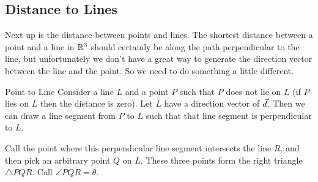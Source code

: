 \subsection{Distance to Lines}

Next up is the distance between points and lines. The shortest distance between a point and a line in $\mathbb{R}^3$ should certainly be along the path perpendicular to the line, but unfortunately we don't have a great way to generate the direction vector between the line and the point. So we need to do something a little different. 

\begin{claim}{Point to Line}
Consider a line $L$ and a point $P$ such that $P$ does not lie on $L$ (if $P$ lies on $L$ then the distance is zero). Let $L$ have a direction vector of $\vec{d}$. Then we can draw a line segment from $P$ to $L$ such that that line segment is perpendicular to $L$.
\vspace{1em}
\begin{center}
\end{center}
\vspace{1em}
Call the point where this perpendicular line segment intersects the line $R$, and then pick an arbitrary point $Q$ on $L$. These three points form the right triangle $\triangle PQR$. Call $\angle PQR=\theta$.
\vspace{1em}
\begin{center}
\end{center}
\end{claim}
